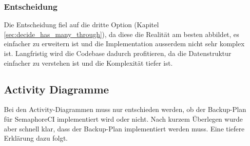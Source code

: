 \subsubsection{Entscheidung}
Die Entscheidung fiel auf die dritte Option (Kapitel \ref{sec:decide_has_many_through}), da diese die Realität am besten
abbildet, es einfacher zu erweitern ist und die Implementation ausserdem nicht sehr komplex ist. \newline
Langfristig wird die Codebase dadurch profitieren, da die Datenstruktur einfacher zu verstehen ist und die Komplexität
tiefer ist.

\subsection{Activity Diagramme}
Bei den Activity-Diagrammen muss nur entschieden werden, ob der Backup-Plan für SemaphoreCI implementiert wird oder nicht.
Nach kurzem Überlegen wurde aber schnell klar, dass der Backup-Plan implementiert werden muss. Eine tiefere Erklärung
dazu folgt.

